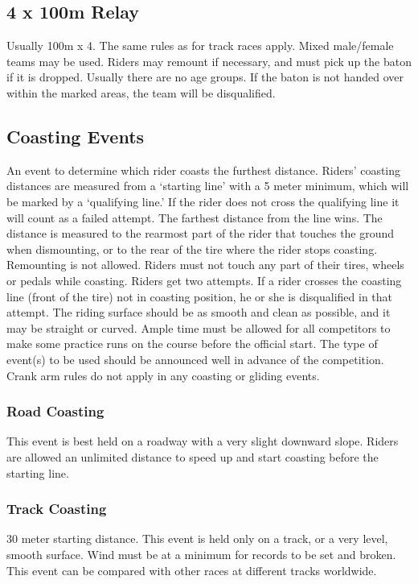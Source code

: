 \subsection{4 x 100m Relay}
Usually 100m x 4.
The same rules as for track races apply.
Mixed male/female teams may be used.
Riders may remount if necessary, and must pick up the baton if it is dropped.
Usually there are no age groups.
If the baton is not handed over within the marked areas, the team will be disqualified.

\subsection{Coasting Events}
An event to determine which rider coasts the furthest distance.
Riders’ coasting distances are measured from a ‘starting line’ with a 5 meter minimum, which will be marked by a `qualifying line.'
If the rider does not cross the qualifying line it will count as a failed attempt.
The farthest distance from the line wins.
The distance is measured to the rearmost part of the rider that touches the ground when dismounting, or to the rear of the tire where the rider stops coasting.
Remounting is not allowed.
Riders must not touch any part of their tires, wheels or pedals while coasting.
Riders get two attempts.
If a rider crosses the coasting line (front of the tire) not in coasting position, he or she is disqualified in that attempt.
The riding surface should be as smooth and clean as possible, and it may be straight or curved.
Ample time must be allowed for all competitors to make some practice runs on the course before the official start.
The type of event(s) to be used should be announced well in advance of the competition.
Crank arm rules do not apply in any coasting or gliding events.

\subsubsection{Road Coasting}
This event is best held on a roadway with a very slight downward slope.
Riders are allowed an unlimited distance to speed up and start coasting before the starting line.

\subsubsection{Track Coasting \label{subsubsec:racing_alternate-optional-fun-events_coasting_track-coasting}}
30 meter starting distance.
This event is held only on a track, or a very level, smooth surface.
Wind must be at a minimum for records to be set and broken.
This event can be compared with other races at different tracks worldwide.


